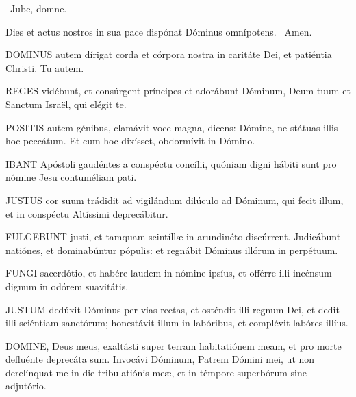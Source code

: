 \V\ Jube, domne.

 Dies et actus nostros in sua pace dispónat Dóminus omnípotens. \R\ Amen.


\lettrine[lines=2]{D}{OMINUS} autem dírigat corda et córpora nostra in caritáte Dei, et patiéntia Christi. Tu autem.



\lettrine[lines=2]{R}{EGES} vidébunt, et consúrgent príncipes et adorábunt Dóminum, Deum tuum et Sanctum Israël, qui elégit te.


\lettrine[lines=2]{P}{OSITIS} autem génibus, clamávit voce magna, dicens: Dómine, ne státuas illis hoc peccátum. Et cum hoc dixísset, obdormívit in Dómino.



\lettrine[lines=2]{I}{BANT} Apóstoli gaudéntes a conspéctu concílii, quóniam digni hábiti sunt pro nómine Jesu contuméliam pati.


\lettrine[lines=2]{J}{USTUS} cor suum trádidit ad vigilándum dilúculo ad Dóminum, qui fecit illum, et in conspéctu Altíssimi deprecábitur.


\lettrine[lines=2]{F}{ULGEBUNT} justi, et tamquam scintíllæ in arundinéto discúrrent. Judicábunt natiónes, et dominabúntur pópulis: et regnábit Dóminus illórum in perpétuum.


\lettrine[lines=2]{F}{UNGI} sacerdótio, et habére laudem in nómine ipsíus, et offérre illi incénsum dignum in odórem suavitátis.


\lettrine[lines=2]{J}{USTUM} dedúxit Dóminus per vias rectas, et osténdit illi regnum Dei, et dedit illi sciéntiam sanctórum; honestávit illum in labóribus, et complévit labóres illíus.


\lettrine[lines=2]{D}{OMINE}, Deus meus, exaltásti super terram habitatiónem meam, et pro morte defluénte deprecáta sum. Invocávi Dóminum, Patrem Dómini mei, ut non derelínquat me in die tribulatiónis meæ, et in témpore superbórum sine adjutório.

